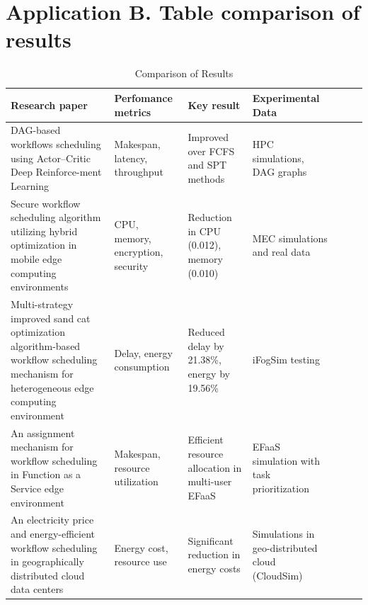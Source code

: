 \documentclass[a4paper, final]{article}
\begin{document}
\section* {Application B. Table comparison of results}
\hypertarget{ApplB}{}
\begin{table}[H]
    \centering
    \caption{Comparison of Results}
    \label{tbl:2}
    \scriptsize
    \begin{tabularx}{\textwidth}{|p{3.5cm}|X|X|X|X|X|X|}
    \hline
    \textbf{Research paper} & \textbf{Perfomance metrics} & \textbf{Key result} & \textbf{Experimental Data} \\
    \hline

    DAG-based workflows scheduling using Actor–Critic Deep Reinforce-ment Learning \cite{bib:1_acrl} &
    Makespan, latency, throughput &
    Improved over FCFS and SPT methods &
    HPC simulations, DAG graphs \\
    \hline

    Secure workflow scheduling algorithm utilizing hybrid optimization in mobile edge computing environments \cite{bib:2_faro} &
    CPU, memory, encryption, security &
    Reduction in CPU (0.012), memory (0.010) &
    MEC simulations and real data \\
    \hline

    Multi-strategy improved sand cat optimization algorithm-based workflow scheduling mechanism for heterogeneous edge computing environment \cite{bib:3_sandcat} &
    Delay, energy consumption &
    Reduced delay by 21.38\%, energy by 19.56\% &
    iFogSim testing \\
    \hline

    An assignment mechanism for workflow scheduling in Function as a Service edge environment \cite{bib:4_faas} &
    Makespan, resource utilization &
    Efficient resource allocation in multi-user EFaaS &
    EFaaS simulation with task prioritization \\
    \hline

    An electricity price and energy-efficient workflow scheduling in geographically distributed cloud data centers \cite{bib:5_epee} &
    Energy cost, resource use &
    Significant reduction in energy costs &
    Simulations in geo-distributed cloud (CloudSim) \\
    \hline


\end{tabularx}
\end{table}
\end{document}
